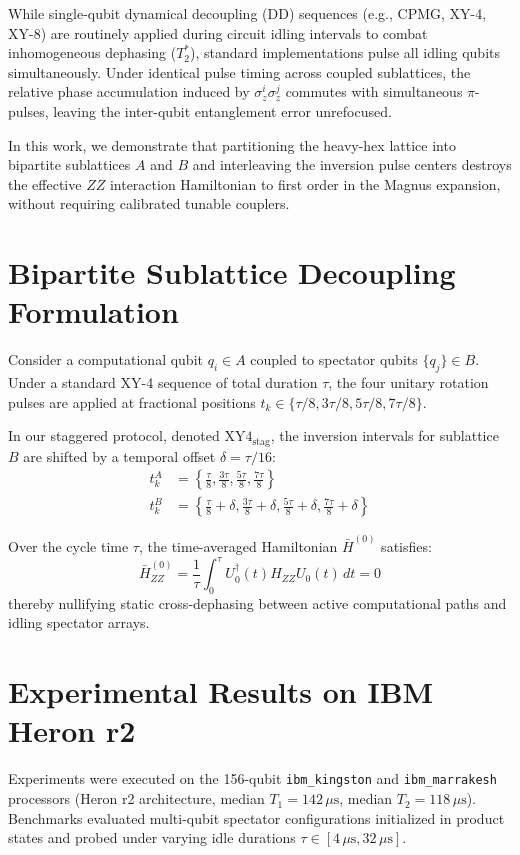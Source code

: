 \documentclass[aps,prapplied,reprint,superscriptaddress]{revtex4-2}
\begin{document}
While single-qubit dynamical decoupling (DD) sequences (e.g., CPMG, XY-4, XY-8) are routinely applied during circuit idling intervals to combat inhomogeneous dephasing ($T_2^*$), standard implementations pulse all idling qubits simultaneously. Under identical pulse timing across coupled sublattices, the relative phase accumulation induced by $\sigma_z^i \sigma_z^j$ commutes with simultaneous $\pi$-pulses, leaving the inter-qubit entanglement error unrefocused.

In this work, we demonstrate that partitioning the heavy-hex lattice into bipartite sublattices $A$ and $B$ and interleaving the inversion pulse centers destroys the effective $ZZ$ interaction Hamiltonian to first order in the Magnus expansion, without requiring calibrated tunable couplers.

\section{Bipartite Sublattice Decoupling Formulation}
Consider a computational qubit $q_i \in A$ coupled to spectator qubits $\{q_j\} \in B$. Under a standard XY-4 sequence of total duration $\tau$, the four unitary rotation pulses are applied at fractional positions $t_k \in \{\tau/8, 3\tau/8, 5\tau/8, 7\tau/8\}$.

In our staggered protocol, denoted $\text{XY4}_{\text{stag}}$, the inversion intervals for sublattice $B$ are shifted by a temporal offset $\delta = \tau / 16$:
\begin{align}
    t_k^A &= \left\{ \frac{\tau}{8}, \frac{3\tau}{8}, \frac{5\tau}{8}, \frac{7\tau}{8} \right\} \\
    t_k^B &= \left\{ \frac{\tau}{8} + \delta, \frac{3\tau}{8} + \delta, \frac{5\tau}{8} + \delta, \frac{7\tau}{8} + \delta \right\}
\end{align}

Over the cycle time $\tau$, the time-averaged Hamiltonian $\bar{H}^{(0)}$ satisfies:
\begin{equation}
    \bar{H}^{(0)}_{ZZ} = \frac{1}{\tau} \int_0^\tau U_0^\dagger(t) H_{ZZ} U_0(t) \, dt = 0
\end{equation}
thereby nullifying static cross-dephasing between active computational paths and idling spectator arrays.

\section{Experimental Results on IBM Heron r2}
Experiments were executed on the 156-qubit \texttt{ibm\_kingston} and \texttt{ibm\_marrakesh} processors (Heron r2 architecture, median $T_1 = 142\,\mu\text{s}$, median $T_2 = 118\,\mu\text{s}$). Benchmarks evaluated multi-qubit spectator configurations initialized in product states and probed under varying idle durations $\tau \in [4\,\mu\text{s}, 32\,\mu\text{s}]$.
\end{document}

